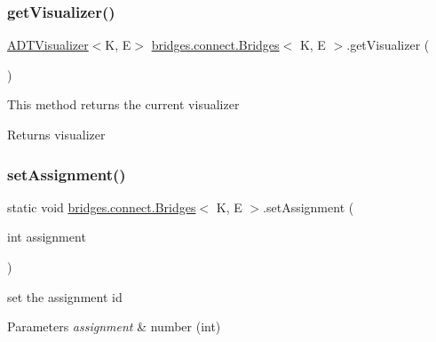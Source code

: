 \hypertarget{classbridges_1_1connect_1_1_bridges_a7193b48c9dc01b04dfcf0d66fa2f59fb}{}\label{classbridges_1_1connect_1_1_bridges_a7193b48c9dc01b04dfcf0d66fa2f59fb} 
\subsubsection{\texorpdfstring{get\+Visualizer()}{getVisualizer()}}
{\footnotesize\ttfamily \hyperlink{classbridges_1_1base_1_1_a_d_t_visualizer}{A\+D\+T\+Visualizer}$<$K, E$>$ \hyperlink{classbridges_1_1connect_1_1_bridges}{bridges.\+connect.\+Bridges}$<$ K, E $>$.get\+Visualizer (\begin{DoxyParamCaption}{ }\end{DoxyParamCaption})}

This method returns the current visualizer \begin{DoxyReturn}{Returns}
visualizer 
\end{DoxyReturn}
\hypertarget{classbridges_1_1connect_1_1_bridges_a24c91901a59ab8b715a864ab8a4d9cdc}{}\label{classbridges_1_1connect_1_1_bridges_a24c91901a59ab8b715a864ab8a4d9cdc} 
\subsubsection{\texorpdfstring{set\+Assignment()}{setAssignment()}}
{\footnotesize\ttfamily static void \hyperlink{classbridges_1_1connect_1_1_bridges}{bridges.\+connect.\+Bridges}$<$ K, E $>$.set\+Assignment (\begin{DoxyParamCaption}\item[{int}]{assignment }\end{DoxyParamCaption})\hspace{0.3cm}{\ttfamily [static]}}

set the assignment id


\begin{DoxyParams}{Parameters}
{\em assignment} & number (int) \\
\hline
\end{DoxyParams}
\hypertarget{classbridges_1_1connect_1_1_bridges_a0cc12a419997a8ef0ef54afe9e65d1e9}{}\label{classbridges_1_1connect_1_1_bridges_a0cc12a419997a8ef0ef54afe9e65d1e9} 
